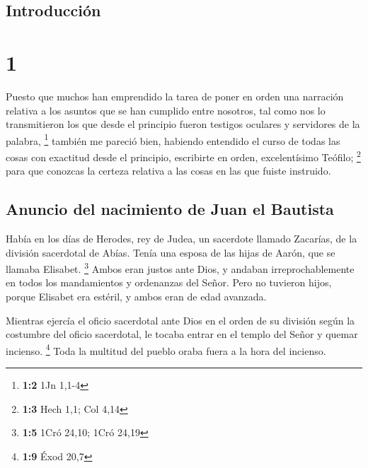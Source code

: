 \hypertarget{introducciuxf3n}{%
\subsection{Introducción}\label{introducciuxf3n}}

\hypertarget{section}{%
\section{1}\label{section}}

 Puesto que muchos han emprendido la tarea de poner en
orden una narración relativa a los asuntos que se han cumplido entre
nosotros,  tal como nos lo transmitieron los que desde el
principio fueron testigos oculares y servidores de la palabra,
\footnote{\textbf{1:2} 1Jn 1,1-4}  también me pareció
bien, habiendo entendido el curso de todas las cosas con exactitud desde
el principio, escribirte en orden, excelentísimo Teófilo; \footnote{\textbf{1:3}
  Hech 1,1; Col 4,14}  para que conozcas la certeza
relativa a las cosas en las que fuiste instruido.

\hypertarget{anuncio-del-nacimiento-de-juan-el-bautista}{%
\subsection{Anuncio del nacimiento de Juan el
Bautista}\label{anuncio-del-nacimiento-de-juan-el-bautista}}

 Había en los días de Herodes, rey de Judea, un sacerdote
llamado Zacarías, de la división sacerdotal de Abías. Tenía una esposa
de las hijas de Aarón, que se llamaba Elisabet. \footnote{\textbf{1:5}
  1Cró 24,10; 1Cró 24,19}  Ambos eran justos ante Dios, y
andaban irreprochablemente en todos los mandamientos y ordenanzas del
Señor.  Pero no tuvieron hijos, porque Elisabet era
estéril, y ambos eran de edad avanzada.

 Mientras ejercía el oficio sacerdotal ante Dios en el
orden de su división  según la costumbre del oficio
sacerdotal, le tocaba entrar en el templo del Señor y quemar incienso.
\footnote{\textbf{1:9} Éxod 20,7}  Toda la multitud del
pueblo oraba fuera a la hora del incienso.

